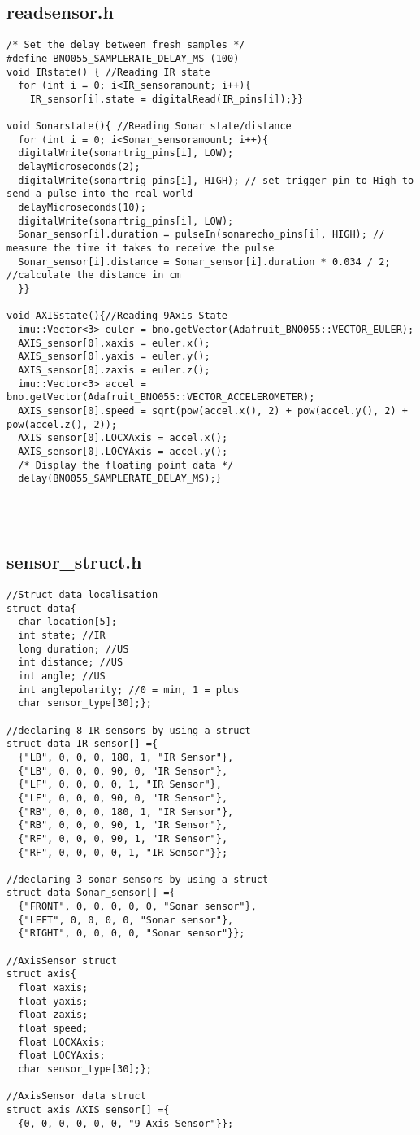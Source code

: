 \subsection{readsensor.h}
\begin{lstlisting}
/* Set the delay between fresh samples */
#define BNO055_SAMPLERATE_DELAY_MS (100)
void IRstate() { //Reading IR state
  for (int i = 0; i<IR_sensoramount; i++){
    IR_sensor[i].state = digitalRead(IR_pins[i]);}}

void Sonarstate(){ //Reading Sonar state/distance
  for (int i = 0; i<Sonar_sensoramount; i++){
  digitalWrite(sonartrig_pins[i], LOW); 
  delayMicroseconds(2);
  digitalWrite(sonartrig_pins[i], HIGH); // set trigger pin to High to send a pulse into the real world
  delayMicroseconds(10);
  digitalWrite(sonartrig_pins[i], LOW); 
  Sonar_sensor[i].duration = pulseIn(sonarecho_pins[i], HIGH); // measure the time it takes to receive the pulse
  Sonar_sensor[i].distance = Sonar_sensor[i].duration * 0.034 / 2; //calculate the distance in cm
  }}

void AXISstate(){//Reading 9Axis State
  imu::Vector<3> euler = bno.getVector(Adafruit_BNO055::VECTOR_EULER);
  AXIS_sensor[0].xaxis = euler.x();
  AXIS_sensor[0].yaxis = euler.y();
  AXIS_sensor[0].zaxis = euler.z();
  imu::Vector<3> accel = bno.getVector(Adafruit_BNO055::VECTOR_ACCELEROMETER);
  AXIS_sensor[0].speed = sqrt(pow(accel.x(), 2) + pow(accel.y(), 2) + pow(accel.z(), 2));
  AXIS_sensor[0].LOCXAxis = accel.x();
  AXIS_sensor[0].LOCYAxis = accel.y();
  /* Display the floating point data */
  delay(BNO055_SAMPLERATE_DELAY_MS);}




\end{lstlisting}
\subsection{sensor\_struct.h}
\begin{lstlisting}
//Struct data localisation
struct data{
  char location[5];
  int state; //IR
  long duration; //US
  int distance; //US
  int angle; //US
  int anglepolarity; //0 = min, 1 = plus 
  char sensor_type[30];};

//declaring 8 IR sensors by using a struct
struct data IR_sensor[] ={
  {"LB", 0, 0, 0, 180, 1, "IR Sensor"},
  {"LB", 0, 0, 0, 90, 0, "IR Sensor"},
  {"LF", 0, 0, 0, 0, 1, "IR Sensor"},
  {"LF", 0, 0, 0, 90, 0, "IR Sensor"},
  {"RB", 0, 0, 0, 180, 1, "IR Sensor"},
  {"RB", 0, 0, 0, 90, 1, "IR Sensor"},
  {"RF", 0, 0, 0, 90, 1, "IR Sensor"},
  {"RF", 0, 0, 0, 0, 1, "IR Sensor"}};

//declaring 3 sonar sensors by using a struct
struct data Sonar_sensor[] ={ 
  {"FRONT", 0, 0, 0, 0, 0, "Sonar sensor"},
  {"LEFT", 0, 0, 0, 0, "Sonar sensor"},
  {"RIGHT", 0, 0, 0, 0, "Sonar sensor"}};

//AxisSensor struct
struct axis{
  float xaxis;
  float yaxis;
  float zaxis;
  float speed;
  float LOCXAxis;
  float LOCYAxis;
  char sensor_type[30];};

//AxisSensor data struct
struct axis AXIS_sensor[] ={
  {0, 0, 0, 0, 0, 0, "9 Axis Sensor"}};
\end{lstlisting}
